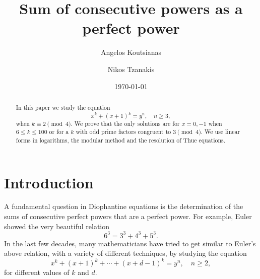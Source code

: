 \documentclass[12pt]{amsart}
\date{\today}
\numberwithin{equation}{section}
\theoremstyle{definition}
\theoremstyle{remark}
\begin{document}
%
\title{Sum of consecutive powers as a perfect power}

\author{Angelos Koutsianas}
\address{Department of Mathematics, Aristotle University of Thessaloniki\\
School of Science, 3rd floor, office 17, 54124, Thessaloniki, Greece} 


\author{Nikos Tzanakis}
\address{Department of Mathematics \& Applied Mathematics \\
University of Crete, Heraklion, Crete, Greece} 



\begin{abstract}
In this paper we study the equation
\begin{equation*}
    x^k + (x+1)^k = y^n,\quad n\geq 3,
\end{equation*}
when $k\equiv 2\pmod{4}$. We prove that the only solutions are for $x=0, -1$ when $6\leq k\leq 100$ or for a $k$ with odd prime factors congruent to $3\pmod{4}$. We use linear forms in logarithms, the modular method and the resolution of Thue equations. 
\end{abstract}

\maketitle

\section{Introduction}

A fundamental question in Diophantine equations is the determination of the sums of consecutive perfect powers that are a perfect power. For example, Euler \cite[art. 249]{Euler59} showed the very beautiful relation
\begin{equation*}
    6^3 = 3^3 + 4^3 + 5^3.
\end{equation*}
In the last few decades, many mathematicians have tried to get similar to Euler's above relation, with a variety of different techniques, by studying the equation
\begin{equation}\label{eq:main_general}
    x^k + (x+ 1)^k + \cdots + (x + d-1)^k = y^n,\quad n\geq 2,
\end{equation}
for different values of $k$ and $d$.
\end{document}
